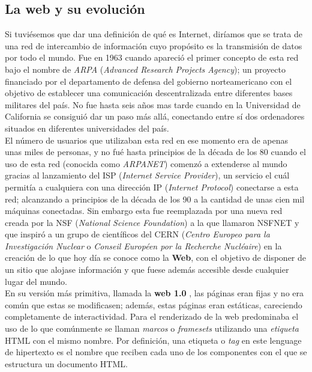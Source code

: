 \documentclass[../main.tex]{subfiles}
\begin{document}
    \subsection{La web y su evolución}
    Si tuviésemos que dar una definición de qué es Internet, diríamos que se trata de una red de intercambio de información cuyo propósito es la transmisión de datos por todo el mundo. Fue en 1963 cuando apareció el primer concepto de esta red bajo el nombre de \textit{ARPA} (\textit{Advanced Research Projects Agency}); un proyecto financiado por el departamento de defensa del gobierno norteamericano con el objetivo de establecer una comunicación descentralizada entre diferentes bases militares del país. No fue hasta seis años mas tarde cuando en la Universidad de California se consiguió dar un paso más allá, conectando entre sí dos ordenadores situados en diferentes universidades del país. \\
    
    El número de usuarios que utilizaban esta red en ese momento era de apenas unas miles de personas, y no fué hasta principios de la década de los 80 cuando el uso de esta red (conocida como \textit{ARPANET}) comenzó a extenderse al mundo gracias al lanzamiento del ISP (\textit{Internet Service Provider}), un servicio el cuál permitía a cualquiera con una dirección IP (\textit{Internet Protocol}) conectarse a esta red; alcanzando a principios de la década de los 90 a la cantidad de unas cien mil máquinas conectadas. Sin embargo esta fue reemplazada por una nueva red creada por la NSF (\textit{National Science Foundation}) a la que llamaron NSFNET y que inspiró a un grupo de científicos del CERN (\textit{Centro Europeo para la Investigación Nuclear} o \textit{Conseil Européen por la Recherche Nucléaire}) en la creación de lo que hoy día se conoce como la \textbf{Web}, con el objetivo de disponer de un sitio que alojase información y que fuese además accesible desde cualquier lugar del mundo.\\ 
    
    
    En su versión más primitiva, llamada la \textbf{web 1.0} \cite{web1.0}, las páginas eran fijas y no era común que estas se modificasen; además, estas páginas eran estáticas, careciendo completamente de interactividad. Para el renderizado de la web predominaba el uso de lo que comúnmente se llaman \textit{marcos} o \textit{framesets} utilizando una \textit{etiqueta} HTML con el mismo nombre. Por definición, una etiqueta o \textit{tag} en este lenguage de hipertexto es el nombre que reciben cada uno de los componentes con el que se estructura un documento HTML.
    
\end{document}
